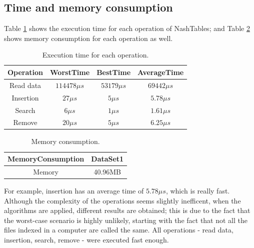 \documentclass{sig-alternate-05-2015}
\begin{document}
  \subsection{Time and memory consumption}
  Table \ref{tab:exTime} shows the execution time for each operation of NashTables; and Table \ref{table:mem} shows
  memory consumption for each operation as well.
  \begin{table}
    \small
    \centering
    \caption{Execution time for each operation.}
    \label{tab:exTime}
    \begin{tabular}{cccc}
      \hline
      \textbf{Operation} & \textbf{WorstTime} & 	\textbf{BestTime} & \textbf{AverageTime} \\ \hline
      Read data          & $114478\mu s$      & $53179\mu s$      & $69442\mu s$         \\
      Insertion          & $27\mu s$               & $5\mu s$               & $5.78\mu s$               \\
      Search             & $6\mu s$               & $1\mu s$              & $1.61\mu s$               \\
      Remove             & $20\mu s$              & $5\mu s$              & $6.25\mu s$              \\ \hline
    \end{tabular}
  \end{table}
  \begin{table}[t]
    \centering
    \caption{Memory consumption.}
    \label{table:mem}
    \begin{tabular}{cc}
      \hline\rule{0pt}{2ex}
      \textbf{MemoryConsumption} & \textbf{DataSet1} \\ \hline\rule{0pt}{2ex}
      Memory                     & 40.96MB           \\ \hline
    \end{tabular}
  \end{table}
  For example, insertion has an average time of $5.78\mu s$, which is really fast. Although the complexity of the operations
  seems slightly inefficent, when the algorithms are applied, different results are obtained; this is due to the fact that
  the worst-case scenario is highly unlikely, starting with the fact that not all the files indexed in a computer are called the
  same. All operations - read data, insertion, search, remove - were executed fast enough.

  
  
\end{document}

